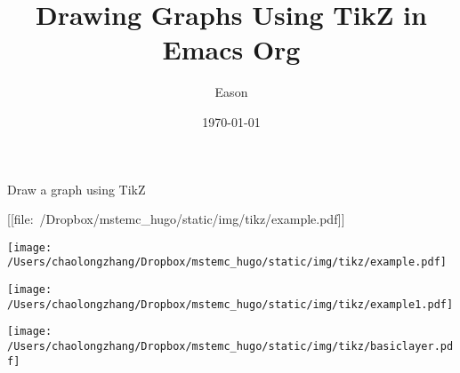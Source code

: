 \documentclass[koma,utopia,a4paper,captions=tableheading,11pt,listings-sv,microtype,paralist,colorlinks=true,urlcolor=blue]{org-article}
\author{Eason}
\date{\today}
\title{Drawing Graphs Using TikZ in Emacs Org}
\begin{document}
\maketitle
\tableofcontents



Draw a graph using TikZ

[[file:~/Dropbox/mstemc_hugo/static/img/tikz/example.pdf]]

\begin{center}
\texttt{[image: /Users/chaolongzhang/Dropbox/mstemc\_hugo/static/img/tikz/example.pdf]}
\end{center}

\begin{center}
\texttt{[image: /Users/chaolongzhang/Dropbox/mstemc\_hugo/static/img/tikz/example1.pdf]}
\end{center}

\begin{center}
\texttt{[image: /Users/chaolongzhang/Dropbox/mstemc\_hugo/static/img/tikz/basiclayer.pdf]}
\end{center}
\end{document}
